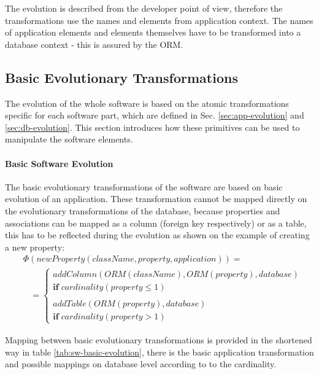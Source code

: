 \documentclass[11pt]{article}
\begin{document}
The evolution is described from the developer point of view, therefore the transformations use the names and elements from application context. The names of application elements and elements themselves have to be transformed into a database context - this is assured by the ORM.



\subsection{Basic Evolutionary Transformations}
\label{sec:sw-basic-evolution}
The evolution of the whole software is based on the atomic transformations specific for each software part, which are defined in Sec. \ref{sec:app-evolution} and \ref{sec:db-evolution}. This section introduces how these primitives can be used to manipulate the software elements.

\paragraph{Basic Software Evolution} The basic evolutionary transformations of the software are based on basic evolution of an application. These transformation cannot be  mapped directly on the evolutionary transformations of the database, because properties and associations can be mapped as a column (foreign key respectively) or as a table, this has to be reflected during the evolution as shown on the example of creating a new property: 
\begin{align*}
& \Phi(newProperty(className, property, application)) = \\
& \;\;\; = \begin{cases}
  addColumn(ORM(className), ORM(property), database) \\\mathbf{if} \; cardinality(property \leq 1)  \\\\
  addTable(ORM(property), database) \\
  \mathbf{if} \; cardinality(property > 1)  
 \end{cases}
\end{align*}

Mapping between basic evolutionary transformations is provided in the shortened way in table \ref{tab:sw-basic-evolution}, there is the basic application transformation and possible mappings on database level according to to the cardinality.  
\end{document}
